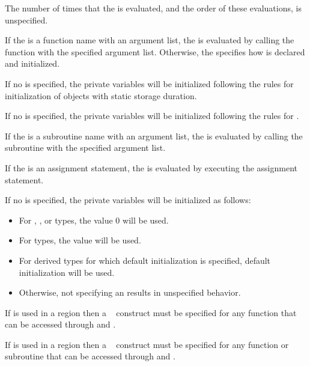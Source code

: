 The number of times that the  is evaluated, and the order of these 
evaluations, is unspecified.

\ccppspecificstart
If the  is a function name with an argument list, the  is 
evaluated by calling the function with the specified argument list. Otherwise, the 
 specifies how  is declared and initialized.
\ccppspecificend
\bigskip

\cspecificstart
If no  is specified, the private variables will be initialized following the 
rules for initialization of objects with static storage duration.
\cspecificend

\cppspecificstart
If no  is specified, the private variables will be initialized following the 
rules for .
\cppspecificend
\bigskip

\fortranspecificstart
If the  is a subroutine name with an argument list, the  is 
evaluated by calling the subroutine with the specified argument list.

If the  is an assignment statement, the  is evaluated by 
executing the assignment statement.

If no  is specified, the private variables will be initialized as follows:
\begin{itemize}
\item For , , or  types, the value 0 will be used.
\item For  types, the value  will be used.
\item For derived types for which default initialization is specified, default initialization 
will be used.
\item Otherwise, not specifying an  results in unspecified behavior.
\end{itemize}
\fortranspecificend
\bigskip

\ccppspecificstart
If  is used in a  region then a ~ construct 
must be specified for any function that can be accessed through  and 
.
\ccppspecificend
\bigskip

\fortranspecificstart
If  is used in a  region then a ~ construct 
must be specified for any function or subroutine that can be accessed through  
and .
\fortranspecificend

